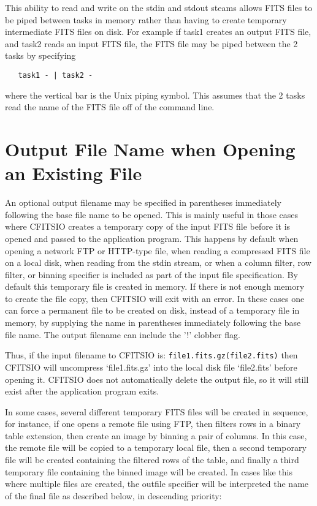 \documentclass[11pt]{book}
\begin{document}
This ability to read and write on the stdin and stdout steams allows
FITS files to be piped between tasks in memory rather than having to
create temporary intermediate FITS files on disk.  For example if task1
creates an output FITS file, and task2 reads an input FITS file, the
FITS file may be piped between the 2 tasks by specifying

\begin{verbatim}
   task1 - | task2 -
\end{verbatim}
where the vertical bar is the Unix piping symbol.  This assumes that the 2
tasks read the name of the FITS file off of the command line.


\section{Output File Name when Opening an Existing File}

An optional output filename may be specified in parentheses immediately
following the base file name to be opened.  This is mainly useful in
those cases where CFITSIO creates a temporary copy of the input FITS
file before it is opened and passed to the application program.  This
happens by default when opening a network FTP or HTTP-type file, when
reading a compressed FITS file on a local disk, when reading from the
stdin stream, or when a column filter, row filter, or binning specifier
is included as part of the input file specification.  By default this
temporary file is created in memory.  If there is not enough memory to
create the file copy, then CFITSIO will exit with an error.   In these
cases one can force a permanent file to be created on disk, instead of
a temporary file in memory, by supplying the name in parentheses
immediately following the base file name.  The output filename can
include the '!' clobber flag.

Thus, if the input filename to CFITSIO is:
\verb+file1.fits.gz(file2.fits)+
then CFITSIO will uncompress `file1.fits.gz' into the local disk file
`file2.fits' before opening it.  CFITSIO does not automatically delete
the output file, so it will still exist after the application program
exits.

In some cases, several different temporary FITS files will be created
in sequence, for instance, if one opens a remote file using FTP, then
filters rows in a binary table extension, then create an image by
binning a pair of columns.  In this case, the remote file will be
copied to a temporary local file, then a second temporary file will be
created containing the filtered rows of the table, and finally a third
temporary file containing the binned image will be created.  In cases
like this where multiple files are created, the outfile specifier will
be interpreted the name of the final file as described below, in descending
priority:
\end{document}
